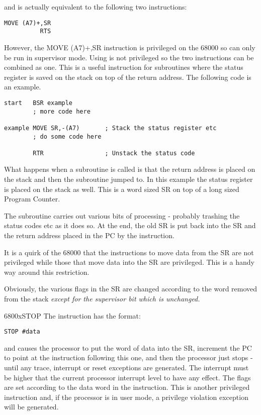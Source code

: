 and is actually equivalent to the following two instructions:

\begin{lstlisting}[firstnumber=1,]
          MOVE (A7)+,SR
          RTS
\end{lstlisting}

However, the MOVE (A7)+,SR instruction is privileged on the 68000
      so can only be run in supervisor mode. Using  is not privileged so
      the two instructions can be combined as one. This is a useful
      instruction for subroutines where the status register is saved on the
      stack on top of the return address. The following code is an
      example.

\begin{lstlisting}[firstnumber=1,caption={RTR Example},label={lst:RtrExample}]
start   BSR example
        ; more code here

example MOVE SR,-(A7)       ; Stack the status register etc
        ; do some code here

        RTR                 ; Unstack the status code
\end{lstlisting}

What happens when a subroutine is called is that the return
      address is placed on the stack and then the subroutine jumped to. In
      this example the status register is placed on the stack as well. This is
      a word sized SR on top of a long sized Program Counter.

The subroutine carries out various bits of processing -{} probably
      trashing the status codes etc as it does so. At the end, the old SR is
      put back into the SR and the return address placed in the PC by the 
      instruction.

It is a quirk of the 68000 that the instructions to move data from
      the SR are not privileged while those that move data into the SR are
      privileged. This is a handy way around this restriction.

Obviously, the various flags in the SR are changed according to
      the word removed from the stack \emph{except for the supervisor bit
      which is unchanged.}

\mc6800x{STOP}
The  instruction has the format:

\begin{lstlisting}[firstnumber=1,]
          STOP #data
\end{lstlisting}

and causes the processor to put the word of data into the SR,
      increment the PC to point at the instruction following this one, and
      then the processor just stops -{} until any trace, interrupt or reset
      exceptions are generated. The interrupt must be higher that the current
      processor interrupt level to have any effect. The flags are set
      according to the data word in the instruction. This is another
      privileged instruction and, if the processor is in user mode, a
      privilege violation exception will be generated.

